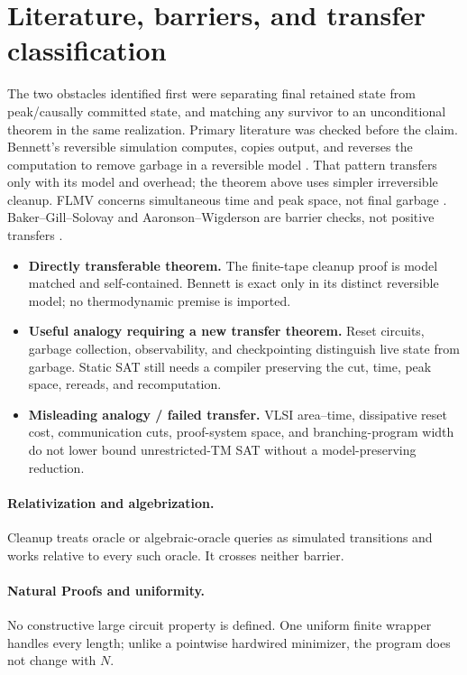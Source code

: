\documentclass[11pt]{article}
\begin{document}
\section{Literature, barriers, and transfer classification}
The two obstacles identified first were separating final retained state from
peak/causally committed state, and matching any survivor to an unconditional
theorem in the same realization. Primary literature was checked before the
claim. Bennett's reversible simulation computes, copies output, and reverses
the computation to remove garbage in a reversible model \cite{Bennett1973}.
That pattern transfers only with its model and overhead; the theorem above
uses simpler irreversible cleanup. FLMV concerns simultaneous time and peak
space, not final garbage \cite{FLMV2005}. Baker--Gill--Solovay and
Aaronson--Wigderson are barrier checks, not positive transfers
\cite{BGS1975,AW2009}.

\begin{itemize}[leftmargin=1.5em]
\item \textbf{Directly transferable theorem.} The finite-tape cleanup proof is
model matched and self-contained. Bennett is exact only in its distinct
reversible model; no thermodynamic premise is imported.
\item \textbf{Useful analogy requiring a new transfer theorem.} Reset
circuits, garbage collection, observability, and checkpointing distinguish
live state from garbage. Static SAT still needs a compiler preserving the
cut, time, peak space, rereads, and recomputation.
\item \textbf{Misleading analogy / failed transfer.} VLSI area--time,
dissipative reset cost, communication cuts, proof-system space, and
branching-program width do not lower bound unrestricted-TM SAT without a
model-preserving reduction.
\end{itemize}

\paragraph{Relativization and algebrization.}
Cleanup treats oracle or algebraic-oracle queries as simulated transitions
and works relative to every such oracle. It crosses neither barrier.

\paragraph{Natural Proofs and uniformity.}
No constructive large circuit property is defined. One uniform finite
wrapper handles every length; unlike a pointwise hardwired minimizer, the
program does not change with \(N\).
\end{document}
